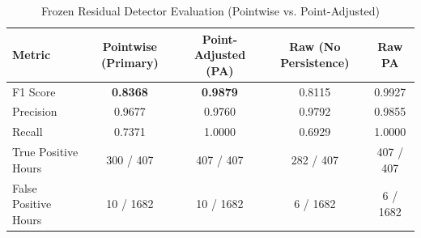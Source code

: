\begin{table}[htbp]
\centering
\caption{Frozen Residual Detector Evaluation (Pointwise vs. Point-Adjusted)}
\label{tab:detector_eval}
\begin{tabular}{lcccc}
\toprule
Metric & Pointwise (Primary) & Point-Adjusted (PA) & Raw (No Persistence) & Raw PA \\
\midrule
F1 Score & \textbf{0.8368} & \textbf{0.9879} & 0.8115 & 0.9927 \\
Precision & 0.9677 & 0.9760 & 0.9792 & 0.9855 \\
Recall & 0.7371 & 1.0000 & 0.6929 & 1.0000 \\
True Positive Hours & 300 / 407 & 407 / 407 & 282 / 407 & 407 / 407 \\
False Positive Hours & 10 / 1682 & 10 / 1682 & 6 / 1682 & 6 / 1682 \\
\bottomrule
\end{tabular}
\end{table}
